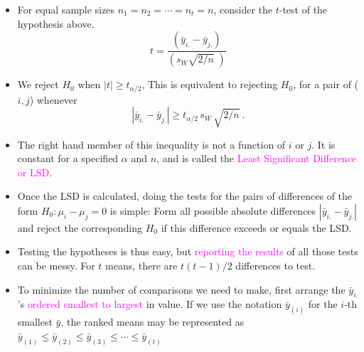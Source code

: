 \documentclass[xcolor=dvipsnames,12pt]{beamer}
\begin{document}
\begin{frame}
\begin{itemize}
\item For equal sample sizes $n_1 = n_2 = \cdots = n_t = n$, consider
the $t$-test of the hypothesis above.
$$
  t = \frac{(\bar{y}_{i.} - \bar{y}_{j.})}{ (s_W \sqrt{2/n} \;)}
$$
\item We reject $H_0$ when $|t| \geq t_{\alpha/2}$,
 This is equivalent to rejecting $H_0$, for a pair of ($i,j$)
whenever
$$
  |\bar{y}_{i.} - \bar{y}_{j.}| \geq t_{\alpha/2} \,
  s_W \, \sqrt{2/n } \ .
$$
\item The right hand member of this inequality is not a function of $i$ or $j$.
It is constant for a specified $\alpha$ and $n$, and is called the {\textcolor{magenta}{Least Significant
Difference or LSD}}.
\end{itemize}
\end{frame}



\begin{frame}
\begin{itemize}
\item  Once the LSD is calculated,  doing the tests for the pairs of differences of the
form $H_0: \mu_i - \mu_j = 0$ is simple:  Form all possible
absolute differences $|\bar{y}_{i.} - \bar{y}_{j.}|$ and reject
the corresponding $H_0$ if this difference exceeds or  equals the LSD.
\item Testing the hypotheses is thus easy, but {\textcolor{magenta}{reporting the
results}} of all those tests can be messy. For $t$ means, there
are $t(t-1)/2$ differences to test.
\item To minimize the number of comparisons we need to make, first 
arrange  the $\bar{y}_{i.}$'s  {\textcolor{magenta}{ordered smallest to largest}}
in value.  If we use the notation $\bar{y}_{(i)}$
for the $i$-th smallest $\bar{y}$, the ranked means may be
represented as 
$
  \bar{y}_{(1)} \leq  \bar{y}_{(2)} \leq  \bar{y}_{(3)}
  \leq \cdots \leq  \bar{y}_{(t)}
$
\end{itemize}
\end{frame}
\end{document}
